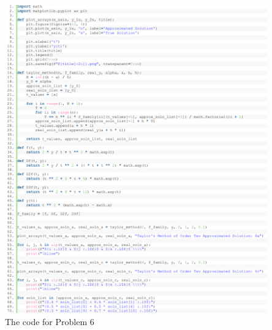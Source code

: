 \documentclass[11pt]{article}
\theoremstyle{break}
\numberwithin{equation}{theorem}
\begin{document}
\begin{center}
    \includegraphics[width=0.85\textwidth]{P6.png}\\
    The code for Problem 6
\end{center}
\end{document}
